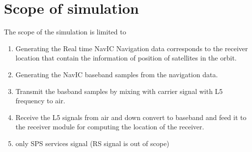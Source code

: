 \section{Scope of simulation}	
The scope of the simulation is limited to 
\begin{enumerate}
	\item Generating the Real time NavIC Navigation data corresponds to the receiver location that contain the information of position of satellites in the orbit.
	\item Generating the NavIC baseband samples from the navigation data.
	\item Transmit the basband samples by mixing with carrier signal with L5 frequency to air.  
	\item Receive the L5 signals from air and down convert to baseband and feed it to the receiver module for computing the location of the receiver.
	\item only SPS services signal (RS signal is out of scope) 
\end{enumerate}



%
